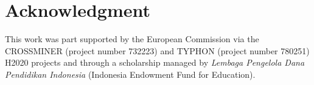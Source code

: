 \documentclass[conference]{IEEEtran}
\begin{document}
\section*{Acknowledgment}
This work was part supported by the European Commission via the CROSSMINER (project number 732223) and TYPHON (project number 780251) H2020 projects and through a scholarship managed by \emph{Lembaga Pengelola Dana Pendidikan Indonesia} (Indonesia Endowment Fund for Education).



\end{document}
